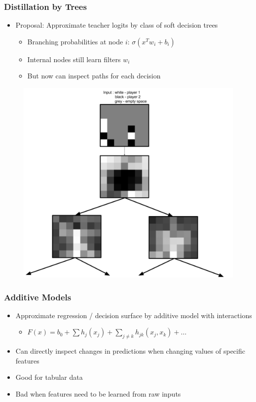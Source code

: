 \documentclass[10pt,mathserif]{beamer}
\begin{document}
\begin{frame}
  \frametitle{Distillation by Trees}
  \begin{itemize}
  \item Proposal: Approximate teacher logits by class of soft decision trees
    \begin{itemize}
    \item Branching probabilities at node $i$: $\sigma\left(x^{T}w_i +
      b_i\right)$
    \item Internal nodes still learn filters $w_i$
    \item But now can inspect paths for each decision
    \end{itemize}
  \end{itemize}
\begin{figure}[ht]
  \centering
  \includegraphics[width=0.5\paperwidth]{figure/connect4}
  \caption{\label{fig:label} }
\end{figure}

\end{frame}

\begin{frame}
  \frametitle{Additive Models}
  \begin{itemize}
  \item Approximate regression / decision surface by additive model with
    interactions
    \begin{itemize}
    \item $F\left(x\right) = b_0 + \sum h_{j} \left(x_j\right) + \sum_{j \neq k} h_{jk}\left(x_{j}, x_{k}\right) + \dots$
    \end{itemize}
  \item Can directly inspect changes in predictions when changing values of
    specific features
  \item Good for tabular data
  \item Bad when features need to be learned from raw inputs
  \end{itemize}
\end{frame}
\end{document}
